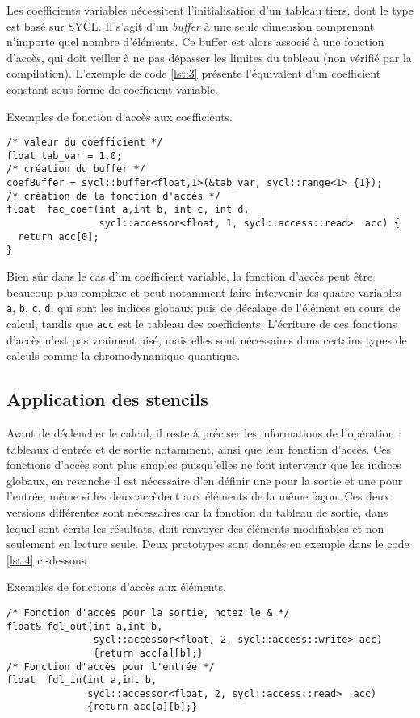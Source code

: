 Les coefficients variables nécessitent l'initialisation d'un tableau tiers, dont le type est basé sur \textsf{SYCL}. Il s'agit d'un \emph{buffer} à une seule dimension comprenant n'importe quel nombre d'éléments. Ce buffer est alors associé à une fonction d'accès, qui doit veiller à ne pas dépasser les limites du tableau (non vérifié par la compilation). L'exemple de code \ref{lst:3} présente l'équivalent d'un coefficient constant sous forme de coefficient variable.
\begin{listing}[H]
\caption{Exemples de fonction d'accès aux coefficients.}
\label{lst:3}
\begin{verbatim}
/* valeur du coefficient */
float tab_var = 1.0;
/* création du buffer */
coefBuffer = sycl::buffer<float,1>(&tab_var, sycl::range<1> {1});
/* création de la fonction d'accès */
float  fac_coef(int a,int b, int c, int d, 
                sycl::accessor<float, 1, sycl::access::read>  acc) {
  return acc[0];
}
\end{verbatim}
\end{listing}
Bien sûr dans le cas d'un coefficient variable, la fonction d'accès peut être beaucoup plus complexe et peut notamment faire intervenir les quatre variables \verb!a!, \verb!b!, \verb!c!, \verb!d!, qui sont les indices globaux puis de décalage de l'élément en cours de calcul, tandis que \verb!acc! est le tableau des coefficients. L'écriture de ces fonctions d'accès n'est pas vraiment aisé, mais elles sont nécessaires dans certains types de calculs comme la chromodynamique quantique.

\subsection{Application des stencils}

Avant de déclencher le calcul, il reste à préciser les informations de l'opération : tableaux d'entrée et de sortie notamment, ainsi que leur fonction d'accès. Ces fonctions d'accès sont plus simples puisqu'elles ne font intervenir que les indices globaux, en revanche il est nécessaire d'en définir une pour la sortie et une pour l'entrée, même si les deux accèdent aux éléments de la même façon. Ces deux versions différentes sont nécessaires car la fonction du tableau de sortie, dans lequel sont écrits les résultats, doit renvoyer des éléments modifiables et non seulement en lecture seule. Deux prototypes sont donnés en exemple dans le code \ref{lst:4} ci-dessous.
\begin{listing}[H]
\caption{Exemples de fonctions d'accès aux éléments.}
\label{lst:4}
\begin{verbatim}
/* Fonction d'accès pour la sortie, notez le & */
float& fdl_out(int a,int b, 
               sycl::accessor<float, 2, sycl::access::write> acc) 
               {return acc[a][b];}
/* Fonction d'accès pour l'entrée */
float  fdl_in(int a,int b, 
              sycl::accessor<float, 2, sycl::access::read>  acc) 
              {return acc[a][b];}
\end{verbatim}
\end{listing}

